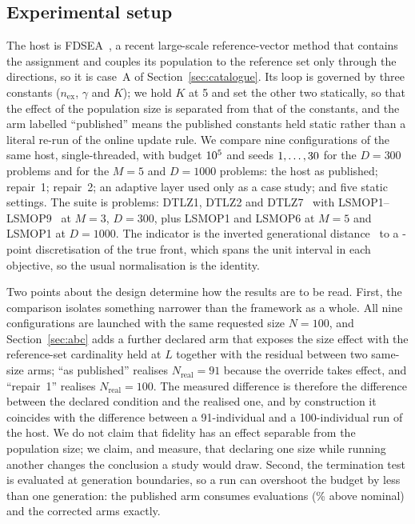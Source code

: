 \documentclass{SCIS2026}
\begin{document}
\subsection{Experimental setup}
\label{sec:setup}
The host is FDSEA~\cite{29}, a recent large-scale reference-vector method that contains the assignment and couples its population to the reference set only through the directions, so it is case~A of Section~\ref{sec:catalogue}. Its loop is governed by three constants ($n_{\mathrm{ex}}$, $\gamma$ and $K$); we hold $K$ at 5 and set the other two statically, so that the effect of the population size is separated from that of the constants, and the arm labelled ``published'' means the published constants held static rather than a literal re-run of the online update rule. We compare nine configurations of the same host, single-threaded, with budget $10^{5}$ and seeds $1,\dots,30$ for the $D=300$ problems and \seedsExt{} for the $M=5$ and $D=1000$ problems: the host as published; repair~1; repair~2; an adaptive layer used only as a case study; and five static settings. The suite is \nProbs{} problems: DTLZ1, DTLZ2 and DTLZ7~\cite{30} with LSMOP1--LSMOP9~\cite{31} at $M=3$, $D=300$, plus LSMOP1 and LSMOP6 at $M=5$ and LSMOP1 at $D=1000$. The indicator is the inverted generational distance~\cite{32} to a -point discretisation of the true front, which spans the unit interval in each objective, so the usual normalisation is the identity.

Two points about the design determine how the results are to be read. First, the comparison isolates something narrower than the framework as a whole. All nine configurations are launched with the same requested size $N=100$, and Section~\ref{sec:abc} adds a further declared arm that exposes the size effect with the reference-set cardinality held at $L$ together with the residual between two same-size arms; ``as published'' realises $N_{\mathrm{real}}=91$ because the override takes effect, and ``repair~1'' realises $N_{\mathrm{real}}=100$. The measured difference is therefore the difference between the declared condition and the realised one, and by construction it coincides with the difference between a 91-individual and a 100-individual run of the host. We do not claim that fidelity has an effect separable from the population size; we claim, and measure, that declaring one size while running another changes the conclusion a study would draw. Second, the termination test is evaluated at generation boundaries, so a run can overshoot the budget by less than one generation: the published arm consumes \feHost{} evaluations (\feOverPct\% above nominal) and the corrected arms \feFix{} exactly.
\end{document}

